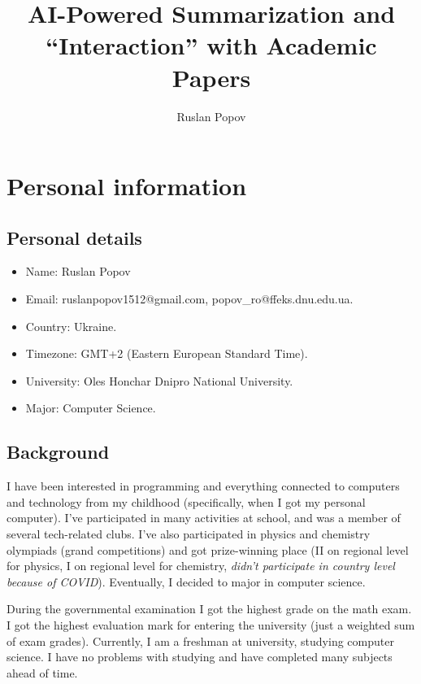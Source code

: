 \documentclass{article}
\title{AI-Powered Summarization and \enquote{Interaction} with Academic Papers}
\author{Ruslan Popov}
\begin{document}
	\maketitle
	
	\tableofcontents
	
	\section{Personal information}
	
	\subsection{Personal details}
	
	\begin{itemize}
		\item Name: Ruslan Popov
		
		\item Email: ruslanpopov1512@gmail.com, popov\_ro@ffeks.dnu.edu.ua.
		
		\item Country: Ukraine.
		
		\item Timezone: GMT+2 (Eastern European Standard Time).
		
		\item University: Oles Honchar Dnipro National University.
		
		\item Major: Computer Science.
	\end{itemize}
	
	\subsection{Background}
	I have been interested in programming and everything connected to computers and technology from my childhood (specifically, when I got my personal computer). I've participated in many activities at school, and was a member of several tech-related clubs. I've also participated in physics and chemistry olympiads (grand competitions) and got prize-winning place (II on regional level for physics, I on regional level for chemistry, \textit{didn't participate in country level because of COVID}). Eventually, I decided to major in computer science.
	
	During the governmental examination I got the highest grade on the math exam. I got the highest evaluation mark for entering the university (just a weighted sum of exam grades). Currently, I am a freshman at university, studying computer science. I have no problems with studying and have completed many subjects ahead of time.
	
\end{document}
